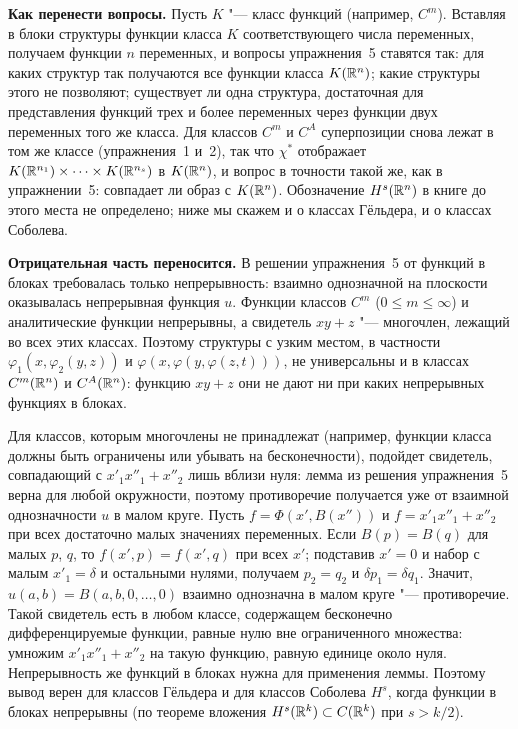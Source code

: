 \begin{solution}[6 (\S\,5)]
\textbf{Как перенести вопросы.} Пусть $K$ "--- класс функций (например,
$C^m$). Вставляя в блоки структуры функции класса $K$ соответствующего числа
переменных, получаем функции $n$ переменных, и вопросы упражнения~5
ставятся так: для каких структур так получаются все функции класса
$K(\mathbb R^n)$; какие структуры этого не позволяют; существует ли одна структура,
достаточная для представления функций трех и более переменных через функции
двух переменных того же класса. Для классов $C^m$ и $C^A$ суперпозиции снова
лежат в том же классе (упражнения~1 и~2), так что $\chi^*$ отображает
$K(\mathbb R^{n_1})\times\dots\times K(\mathbb R^{n_s})$ в $K(\mathbb R^n)$, и вопрос в точности
такой же, как в упражнении~5: совпадает ли образ с $K(\mathbb R^n)$. Обозначение
$H^s(\mathbb R^n)$ в книге до этого места не определено; ниже мы скажем и о классах
Гёльдера, и о классах Соболева.

\textbf{Отрицательная часть переносится.} В решении упражнения~5 от функций
в блоках требовалась только непрерывность: взаимно однозначной на плоскости
оказывалась непрерывная функция $u$. Функции классов $C^m$ ($0\le m\le\infty$)
и аналитические функции непрерывны, а свидетель $xy+z$ "--- многочлен, лежащий
во всех этих классах. Поэтому структуры с узким местом, в частности
$\varphi_1(x,\varphi_2(y,z))$ и $\varphi(x,\varphi(y,\varphi(z,t)))$, не
универсальны и в классах $C^m(\mathbb R^n)$ и $C^A(\mathbb R^n)$: функцию $xy+z$ они не
дают ни при каких непрерывных функциях в блоках.

Для классов, которым многочлены не принадлежат (например, функции класса
должны быть ограничены или убывать на бесконечности), подойдет свидетель,
совпадающий с $x'_1x''_1+x''_2$ лишь вблизи нуля: лемма из решения
упражнения~5 верна для любой окружности, поэтому противоречие получается уже
от взаимной однозначности $u$ в малом круге. Пусть $f=\Phi(x',B(x''))$ и
$f=x'_1x''_1+x''_2$ при всех достаточно малых значениях переменных. Если
$B(p)=B(q)$ для малых $p$, $q$, то $f(x',p)=f(x',q)$ при всех $x'$; подставив
$x'=0$ и набор с малым $x'_1=\delta$ и остальными нулями, получаем $p_2=q_2$
и $\delta p_1=\delta q_1$. Значит, $u(a,b)=B(a,b,0,\dots,0)$ взаимно однозначна
в малом круге "--- противоречие. Такой свидетель есть в любом классе,
содержащем бесконечно дифференцируемые функции, равные нулю вне
ограниченного множества: умножим $x'_1x''_1+x''_2$ на такую функцию, равную
единице около нуля. Непрерывность же функций в блоках нужна для применения
леммы. Поэтому вывод верен для классов Гёльдера и для классов Соболева
$H^s$, когда функции в блоках непрерывны (по теореме вложения
$H^s(\mathbb R^k)\subset C(\mathbb R^k)$ при $s>k/2$).


\end{solution}

